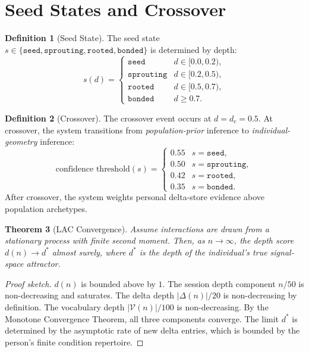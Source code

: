 \documentclass[11pt,twoside]{article}
\theoremstyle{plain}
\newtheorem{theorem}{Theorem}[section]
\theoremstyle{definition}
\newtheorem{definition}[theorem]{Definition}
\theoremstyle{remark}
\begin{document}
\section{Seed States and Crossover}

\begin{definition}[Seed State]\label{def:seed}
The seed state $s\in\{\mathtt{seed},\mathtt{sprouting},\mathtt{rooted},
\mathtt{bonded}\}$ is determined by depth:
\begin{equation}
  s(d) =
  \begin{cases}
    \mathtt{seed}       & d \in [0.0, 0.2),\\
    \mathtt{sprouting}  & d \in [0.2, 0.5),\\
    \mathtt{rooted}     & d \in [0.5, 0.7),\\
    \mathtt{bonded}     & d \ge 0.7.
  \end{cases}
\end{equation}
\end{definition}

\begin{definition}[Crossover]\label{def:crossover}
The crossover event occurs at $d=d_c=0.5$.  At crossover, the system transitions
from \emph{population-prior} inference to \emph{individual-geometry} inference:
\begin{equation}
  \text{confidence threshold}(s) =
  \begin{cases}
    0.55 & s = \mathtt{seed},\\
    0.50 & s = \mathtt{sprouting},\\
    0.42 & s = \mathtt{rooted},\\
    0.35 & s = \mathtt{bonded}.
  \end{cases}
\end{equation}
After crossover, the system weights personal delta-store evidence above
population archetypes.
\end{definition}

\begin{theorem}[LAC Convergence]\label{thm:lac}
Assume interactions are drawn from a stationary process with finite second
moment.  Then, as $n\to\infty$, the depth score $d(n)\to d^*$ almost surely,
where $d^*$ is the depth of the individual's true signal-space attractor.
\end{theorem}

\begin{proof}[Proof sketch]
$d(n)$ is bounded above by $1$.  The session depth component $n/50$ is
non-decreasing and saturates.  The delta depth $|\Delta(n)|/20$ is
non-decreasing by definition.  The vocabulary depth $|\mathcal{V}(n)|/100$ is
non-decreasing.  By the Monotone Convergence Theorem, all three components
converge.  The limit $d^*$ is determined by the asymptotic rate of new delta
entries, which is bounded by the person's finite condition repertoire.
\end{proof}
\end{document}

